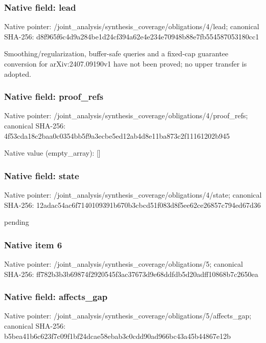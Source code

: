 \documentclass[10pt,a4paper]{article}
\begin{document}
\subsubsection{Native field: lead}
Native pointer: /joint\_\allowbreak{}analysis/synthesis\_\allowbreak{}coverage/obligations/4/lead; canonical SHA-256: d8f965f6c4d9a284be1d24cf394a62e4e234e70948b88e7fb554587053180cc1

\begingroup\raggedright\sloppy Smoothing/\allowbreak{}regularization,\allowbreak{} buffer-safe queries and a fixed-cap guarantee conversion for arXiv:\allowbreak{}2407.09190v1 have not been proved;\allowbreak{} no upper transfer is adopted.\par\endgroup

\subsubsection{Native field: proof\_\allowbreak{}refs}
Native pointer: /joint\_\allowbreak{}analysis/synthesis\_\allowbreak{}coverage/obligations/4/proof\_\allowbreak{}refs; canonical SHA-256: 4f53cda18c2baa0c0354bb5f9a3ecbe5ed12ab4d8e11ba873c2f11161202b945

Native value (empty\_\allowbreak{}array): []

\subsubsection{Native field: state}
Native pointer: /joint\_\allowbreak{}analysis/synthesis\_\allowbreak{}coverage/obligations/4/state; canonical SHA-256: 12adac54ac6f7140109391b670b3cbcd51f083d8f5ee62ce26857c794ed67d36

\begingroup\raggedright\sloppy pending\par\endgroup

\subsubsection{Native item 6}
Native pointer: /joint\_\allowbreak{}analysis/synthesis\_\allowbreak{}coverage/obligations/5; canonical SHA-256: ff782b3b3b69874f2920545f3ac37673d9e68ddfdb5d20adff10868b7c2650ea

\subsubsection{Native field: affects\_\allowbreak{}gap}
Native pointer: /joint\_\allowbreak{}analysis/synthesis\_\allowbreak{}coverage/obligations/5/affects\_\allowbreak{}gap; canonical SHA-256: b5bea41b6c623f7c09f1bf24dcae58ebab3c0cdd90ad966bc43a45b44867e12b
\end{document}
